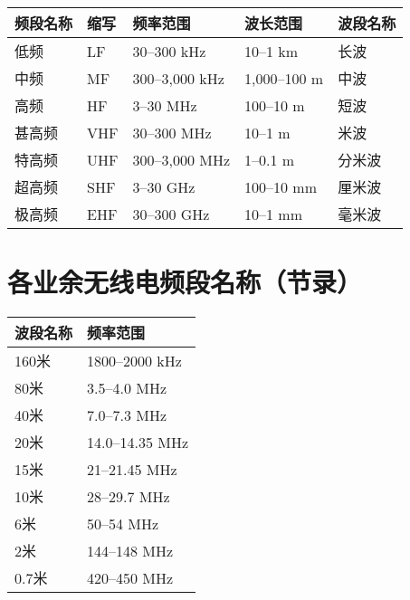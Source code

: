 \begin{longtable}[c]{|l|l|l|l|l|}
  \hline
  \textbf{频段名称} & \textbf{缩写} & \textbf{频率范围}         & \textbf{波长范围} & \textbf{波段名称} \\
  \hline
  低频            & LF          & 30–300 \unit{\kHz}    & 10–1 km       & 长波            \\
  \hline
  中频            & MF          & 300–3,000 \unit{\kHz} & 1,000–100 m   & 中波            \\
  \hline
  高频            & HF          & 3–30 \unit{\MHz}      & 100–10 m      & 短波            \\
  \hline
  甚高频           & VHF         & 30–300 \unit{\MHz}    & 10–1 m        & 米波            \\
  \hline
  特高频           & UHF         & 300–3,000 \unit{\MHz} & 1–0.1 m       & 分米波           \\
  \hline
  超高频           & SHF         & 3–30 \unit{\GHz}      & 100–10 mm     & 厘米波           \\
  \hline
  极高频           & EHF         & 30–300 \unit{\GHz}    & 10–1 mm       & 毫米波           \\
  \hline
\end{longtable}

\newpage

\section{各业余无线电频段名称（节录）}

\begin{longtable}{|l|l|}
  \hline
  \textbf{波段名称} & \textbf{频率范围}          \\
  \hline
  160米          & 1800–2000 \unit{\kHz}  \\
  \hline
  80米           & 3.5–4.0 \unit{\MHz}    \\
  \hline
  40米           & 7.0–7.3 \unit{\MHz}    \\
  \hline
  20米           & 14.0–14.35 \unit{\MHz} \\
  \hline
  15米           & 21–21.45 \unit{\MHz}   \\
  \hline
  10米           & 28–29.7 \unit{\MHz}    \\
  \hline
  6米            & 50–54 \unit{\MHz}      \\
  \hline
  2米            & 144–148 \unit{\MHz}    \\
  \hline
  0.7米          & 420–450 \unit{\MHz}    \\
  \hline
\end{longtable}

